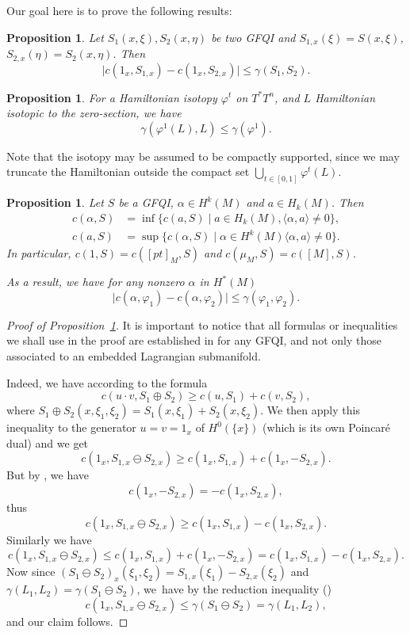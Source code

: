 \documentclass[JEP,XML,SOM,NoFloatCountersInSection,Unicode,published]{cedram}
\numberwithin{equation}{section}
\newcommand{\GFQI}{\textup{GFQI}\xspace}
\theoremstyle{plain}
\newtheorem{proposition}[theorem]{Proposition}
\theoremstyle{definition}
\theoremstyle{remark}
\begin{document}
Our goal here is to prove the following results:

\begin{proposition} \label{B1}
Let $S_{1}(x,\xi), S_{2}(x,\eta)$ be two \GFQI and $S_{1,x}(\xi)=S(x,\xi)$, $S_{2,x}(\eta)=S_{2}(x,\eta)$.
Then
\[
\vert c(1_{x}, S_{1,x})- c(1_{x}, S_{2,x})\vert \leq \gamma (S_{1},S_{2}).
\]
\end{proposition}

\begin{proposition} \label{B2} For a Hamiltonian isotopy $\varphi^{t }$ on $T^*T^n$, and $L$ Hamiltonian isotopic to the zero-section,
we have
\[
\gamma(\varphi^{1} (L),L)\leq \gamma(\varphi^1).
\]
\end{proposition}

Note that the isotopy may be assumed to be compactly supported, since we may truncate the Hamiltonian outside the compact set $\bigcup_{t\in[0,1]}\varphi^{t}(L)$.

\begin{proposition} \label{Prop-B3} Let $S$ be a \GFQI, $\alpha \in H^{k}(M)$ and $a \in H_k(M)$. Then
\begin{align*}
c(\alpha,S)&=\inf \{ c(a,S) \mid a \in H_{k}(M), \langle \alpha, a \rangle \neq 0\},\\
c(a,S)&=\sup\{ c(\alpha,S) \mid \alpha \in H^{k}(M) \langle \alpha, a \rangle \neq 0\}.
\end{align*}
In particular, $c(1,S)=c([pt]_M, S)$ and $c(\mu_M, S)=c([M],S)$.

As a result, we have for any nonzero $\alpha$ in $H^{*}(M)$
\[
\vert c(\alpha, \varphi_{1})- c(\alpha, \varphi_{2}) \vert \leq \gamma (\varphi_{1},\varphi_{2}).
\]
\end{proposition}

\begin{proof}[Proof of Proposition~\ref{B1}]
It is important to notice that all formulas or inequalities we shall use in the proof are established in \cite{Viterbo-STAGGF} for any \GFQI, and not only those associated to an embedded Lagrangian submanifold.

Indeed, we have according to \cite[Prop.\,3.3, p.\,693]{Viterbo-STAGGF} the formula
\[
c(u\cdot v, S_{1}\oplus S_{2}) \geq c(u,S_{1})+c(v,S_{2}),
\]
where $S_{1}\oplus S_{2}(x,\xi_{1},\xi_{2})=S_{1}(x,\xi_{1})+S_{2}(x,\xi_{2})$. We then apply this inequality to the generator $u=v=1_{x}$ of $H^0(\{ x \})$ (which is its own Poincaré dual) and we get
\[
c(1_{x}, S_{1,x}\ominus S_{2,x}) \geq c(1_{x},S_{1,x})+ c(1_{x}, -S_{2,x}).
\]
But by \cite[Prop.\,2.7, p.\,692]{Viterbo-STAGGF}, we have
\[
c(1_{x}, -S_{2,x})=-c(1_{x},S_{2,x}),
\]
thus
\[
c(1_{x}, S_{1,x}\ominus S_{2,x}) \geq c(1_{x},S_{1,x})- c(1_{x}, S_{2,x}).
\]
Similarly we have
\[
c(1_{x}, S_{1,x}\ominus S_{2,x}) \leq c(1_{x},S_{1,x})+ c(1_{x}, -S_{2,x})=c(1_{x},S_{1,x})- c(1_{x}, S_{2,x}).
\]
Now since $(S_1\ominus S_2)_x(\xi_1,\xi_2)=S_{1,x}(\xi_1)-S_{2,x}(\xi_2)$ and $\gamma (L_1,L_2)=\gamma (S_1\ominus S_2)$, we~have by the reduction inequality (\cite[Prop.\,5.1, p.\,705]{Viterbo-STAGGF})
\[
c(1_{x}, S_{1,x}\ominus S_{2,x}) \leq \gamma (S_{1}\ominus S_{2})= \gamma (L_{1},L_{2}),
\]
and our claim follows.
\end{proof}
\end{document}
